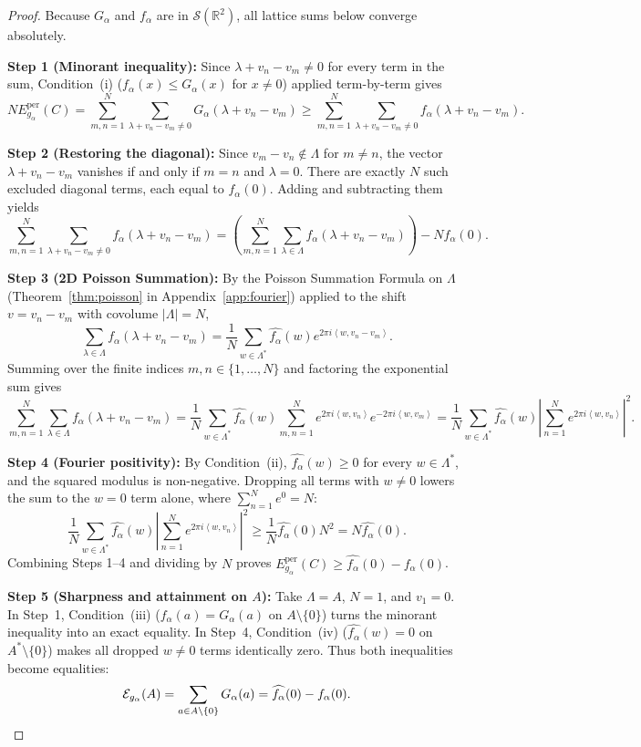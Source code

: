 \documentclass[11pt, a4paper]{article}
\theoremstyle{definition}
\theoremstyle{remark}
\newcommand{\R}{\mathbb{R}}
\newcommand{\Ecal}{\mathcal{E}}
\newcommand{\Scal}{\mathcal{S}}
\newcommand{\abs}[1]{\left\lvert #1 \right\rvert}
\newcommand{\inner}[2]{\left\langle #1, #2 \right\rangle}
\begin{document}
\begin{proof}
Because $G_\alpha$ and $f_\alpha$ are in $\Scal(\R^2)$, all lattice sums below converge absolutely.

\noindent \textbf{Step 1 (Minorant inequality):} Since $\lambda + v_n - v_m \neq 0$ for every term in the sum, Condition~(i) ($f_\alpha(x) \le G_\alpha(x)$ for $x \neq 0$) applied term-by-term gives
\[
N E_{g_\alpha}^{\text{per}}(C) = \sum_{m, n=1}^N \sum_{\lambda + v_n - v_m \neq 0} G_\alpha(\lambda + v_n - v_m) \ge \sum_{m, n=1}^N \sum_{\lambda + v_n - v_m \neq 0} f_\alpha(\lambda + v_n - v_m).
\]

\noindent \textbf{Step 2 (Restoring the diagonal):} Since $v_m - v_n \notin \Lambda$ for $m \neq n$, the vector $\lambda + v_n - v_m$ vanishes if and only if $m = n$ and $\lambda = 0$. There are exactly $N$ such excluded diagonal terms, each equal to $f_\alpha(0)$. Adding and subtracting them yields
\[
\sum_{m, n=1}^N \sum_{\lambda + v_n - v_m \neq 0} f_\alpha(\lambda + v_n - v_m) = \left( \sum_{m, n=1}^N \sum_{\lambda \in \Lambda} f_\alpha(\lambda + v_n - v_m) \right) - N f_\alpha(0).
\]

\noindent \textbf{Step 3 (2D Poisson Summation):} By the Poisson Summation Formula on $\Lambda$ (Theorem~\ref{thm:poisson} in Appendix~\ref{app:fourier}) applied to the shift $v = v_n - v_m$ with covolume $\abs{\Lambda} = N$,
\[
\sum_{\lambda \in \Lambda} f_\alpha(\lambda + v_n - v_m) = \frac{1}{N} \sum_{w \in \Lambda^*} \widehat{f_\alpha}(w) e^{2\pi i \inner{w}{v_n - v_m}}.
\]
Summing over the finite indices $m, n \in \{1, \dots, N\}$ and factoring the exponential sum gives
\[
\sum_{m, n=1}^N \sum_{\lambda \in \Lambda} f_\alpha(\lambda + v_n - v_m) = \frac{1}{N} \sum_{w \in \Lambda^*} \widehat{f_\alpha}(w) \sum_{m, n=1}^N e^{2\pi i \inner{w}{v_n}} e^{-2\pi i \inner{w}{v_m}} = \frac{1}{N} \sum_{w \in \Lambda^*} \widehat{f_\alpha}(w) \abs{\sum_{n=1}^N e^{2\pi i \inner{w}{v_n}}}^2.
\]

\noindent \textbf{Step 4 (Fourier positivity):} By Condition~(ii), $\widehat{f_\alpha}(w) \ge 0$ for every $w \in \Lambda^*$, and the squared modulus is non-negative. Dropping all terms with $w \neq 0$ lowers the sum to the $w = 0$ term alone, where $\sum_{n=1}^N e^0 = N$:
\[
\frac{1}{N} \sum_{w \in \Lambda^*} \widehat{f_\alpha}(w) \abs{\sum_{n=1}^N e^{2\pi i \inner{w}{v_n}}}^2 \ge \frac{1}{N} \widehat{f_\alpha}(0) N^2 = N \widehat{f_\alpha}(0).
\]
Combining Steps 1--4 and dividing by $N$ proves $E_{g_\alpha}^{\text{per}}(C) \ge \widehat{f_\alpha}(0) - f_\alpha(0)$.

\noindent \textbf{Step 5 (Sharpness and attainment on $A$):} Take $\Lambda = A$, $N = 1$, and $v_1 = 0$. In Step~1, Condition~(iii) ($f_\alpha(a) = G_\alpha(a)$ on $A \setminus \{0\}$) turns the minorant inequality into an exact equality. In Step~4, Condition~(iv) ($\widehat{f_\alpha}(w) = 0$ on $A^* \setminus \{0\}$) makes all dropped $w \neq 0$ terms identically zero. Thus both inequalities become equalities:
\[
\Ecal_{g_\alpha}(A) = \sum_{a \in A \setminus \{0\}} G_\alpha(a) = \widehat{f_\alpha}(0) - f_\alpha(0). \qedhere
\]
\end{proof}
\end{document}
